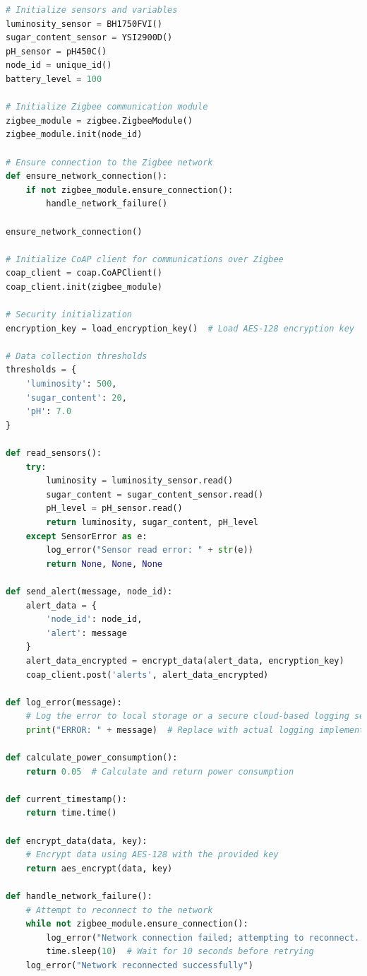 \documentclass{article}
\begin{document}
\begin{enumerate}
\begin{lstlisting}[language=Python]
# Initialize sensors and variables
luminosity_sensor = BH1750FVI()
sugar_content_sensor = YSI2900D()
pH_sensor = pH450C()
node_id = unique_id()
battery_level = 100

# Initialize Zigbee communication module
zigbee_module = zigbee.ZigbeeModule()
zigbee_module.init(node_id)

# Ensure connection to the Zigbee network
def ensure_network_connection():
    if not zigbee_module.ensure_connection():
        handle_network_failure()

ensure_network_connection()

# Initialize CoAP client for communications over Zigbee
coap_client = coap.CoAPClient()
coap_client.init(zigbee_module)

# Security initialization
encryption_key = load_encryption_key()  # Load AES-128 encryption key

# Data collection thresholds
thresholds = {
    'luminosity': 500,
    'sugar_content': 20,
    'pH': 7.0
}

def read_sensors():
    try:
        luminosity = luminosity_sensor.read()
        sugar_content = sugar_content_sensor.read()
        pH_level = pH_sensor.read()
        return luminosity, sugar_content, pH_level
    except SensorError as e:
        log_error("Sensor read error: " + str(e))
        return None, None, None

def send_alert(message, node_id):
    alert_data = {
        'node_id': node_id,
        'alert': message
    }
    alert_data_encrypted = encrypt_data(alert_data, encryption_key)
    coap_client.post('alerts', alert_data_encrypted)

def log_error(message):
    # Log the error to local storage or a secure cloud-based logging service
    print("ERROR: " + message)  # Replace with actual logging implementation

def calculate_power_consumption():
    return 0.05  # Calculate and return power consumption

def current_timestamp():
    return time.time()

def encrypt_data(data, key):
    # Encrypt data using AES-128 with the provided key
    return aes_encrypt(data, key)

def handle_network_failure():
    # Attempt to reconnect to the network
    while not zigbee_module.ensure_connection():
        log_error("Network connection failed; attempting to reconnect...")
        time.sleep(10)  # Wait for 10 seconds before retrying
    log_error("Network reconnected successfully")


\end{lstlisting}
\end{enumerate}
\end{document}
